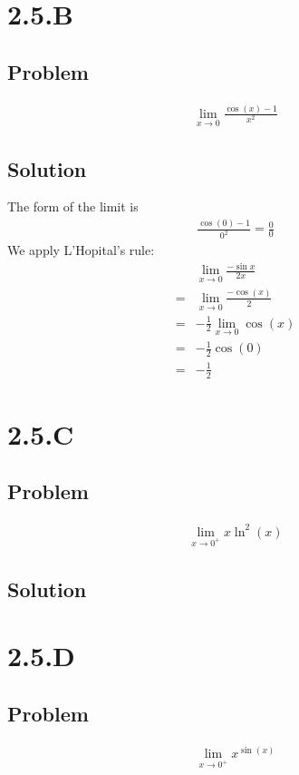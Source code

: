 \documentclass[12pt]{article}
\begin{document}
\section*{2.5.B}

\subsection*{Problem}
\begin{align*}
    \lim_{x \to 0} \frac{\cos(x) - 1}{x^2}
\end{align*}

\subsection*{Solution}
The form of the limit is
\begin{align*}
    \frac{\cos(0) - 1}{0^2} = \frac{0}{0}
\end{align*}
We apply L'Hopital's rule:
\begin{align*}
    & \lim_{x \to 0} \frac{-\sin{x}}{2x} \\
    =& \lim_{x \to 0} \frac{-\cos(x)}{2} \\
    =& -\frac{1}{2} \lim_{x \to 0} \cos(x) \\
    =& -\frac{1}{2} \cos(0) \\
    =& -\frac{1}{2}
\end{align*}




\section*{2.5.C}

\subsection*{Problem}
\begin{align*}
    \lim_{x \to 0^+} x \ln^2(x)
\end{align*}

\subsection*{Solution}




\section*{2.5.D}

\subsection*{Problem}
\begin{align*}
    \lim_{x \to 0^+} x^{\sin(x)}
\end{align*}
\end{document}
